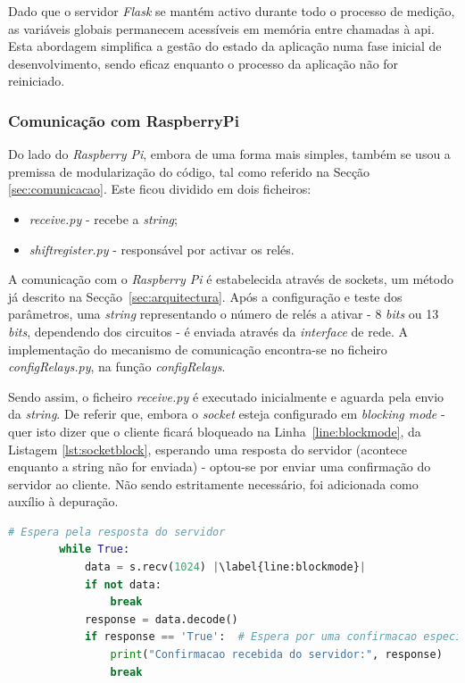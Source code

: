 Dado que o servidor \textit{Flask} se mantém activo durante todo o processo de medição, as variáveis globais permanecem acessíveis em memória entre chamadas à \acrshort{api}. Esta abordagem simplifica a gestão do estado da aplicação numa fase inicial de desenvolvimento, sendo eficaz enquanto o processo da aplicação não for reiniciado.


\subsubsection{Comunicação com RaspberryPi}
\label{sec:raspberrypi}
Do lado do \textit{Raspberry Pi}, embora de uma forma mais simples, também se usou a premissa de modularização do código, tal como referido na Secção \ref{sec:comunicacao}. Este ficou dividido em dois ficheiros:
\begin{itemize}
	\item \textit{receive.py} - recebe a \textit{string};
	\item \textit{shift\textunderscore register.py} - responsável por activar os relés.
\end{itemize}

A comunicação com o \textit{Raspberry Pi} é estabelecida através de sockets, um método já descrito na Secção~\ref{sec:arquitectura}. Após a configuração e teste dos parâmetros, uma \textit{string} representando o número de relés a ativar - 8 \textit{bits} ou 13 \textit{bits}, dependendo dos circuitos - é enviada através da \textit{interface} de rede. A implementação do mecanismo de comunicação encontra-se no ficheiro \textit{configRelays.py}, na função \textit{config\textunderscore Relays}.

Sendo assim, o ficheiro \textit{receive.py} é executado inicialmente e aguarda pela envio da \textit{string}. De referir que, embora o \textit{socket} esteja configurado em \textit{blocking mode} - quer isto dizer que o cliente ficará bloqueado na Linha~\ref{line:blockmode}, da Listagem \ref{lst:socketblock}, esperando uma resposta do servidor \cite{Sockets} (acontece enquanto a string não for enviada) - optou-se por enviar uma confirmação do servidor ao cliente. Não sendo estritamente necessário, foi adicionada como auxílio à depuração.

\begin{minipage}{0.9\linewidth}
	\begin{lstlisting}[language=Python,escapechar=|, caption=\textit{Block Mode \textins{Sockets} configRelays.py}, label=lst:socketblock]
		# Espera pela resposta do servidor
        while True:
            data = s.recv(1024) |\label{line:blockmode}|
            if not data:
                break
            response = data.decode()
            if response == 'True':  # Espera por uma confirmacao especifica do servidor
                print("Confirmacao recebida do servidor:", response)
                break
	\end{lstlisting}
\end{minipage}

